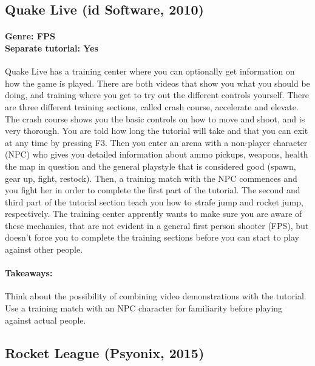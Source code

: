 \subsection{Quake Live (id Software, 2010)}
\paragraph{Genre: FPS \\ Separate tutorial: Yes \\}
Quake Live has a training center where you can optionally get information on how the game is played. There are both videos that show you what you should be doing, and training where you get to try out the different controls yourself. There are three different training sections, called crash course, accelerate and elevate. The crash course shows you the basic controls on how to move and shoot, and is very thorough. You are told how long the tutorial will take and that you can exit at any time by pressing F3. Then you enter an arena with a non-player character (NPC) who gives you detailed information about ammo pickups, weapons, health the map in question and the general playstyle that is considered good (spawn, gear up, fight, restock). Then, a training match with the NPC commences and you fight her in order to complete the first part of the tutorial. The second and third part of the tutorial section teach you how to strafe jump and rocket jump, respectively. The training center apprently wants to make sure you are aware of these mechanics, that are not evident in a general first person shooter (FPS), but doesn't force you to complete the training sections before you can start to play against other people.
\paragraph{Takeaways:}
Think about the possibility of combining video demonstrations with the tutorial.
Use a training match with an NPC character for familiarity before playing against actual people.

\subsection{Rocket League (Psyonix, 2015)}
